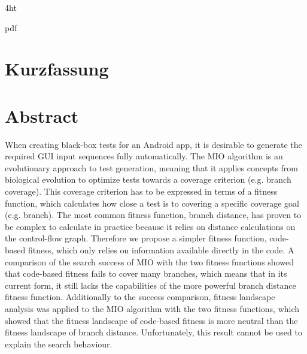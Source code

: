 \documentclass[
  a4paper,  %
  twoside,  %
  bibliography=totoc,
  headsepline,
  cleardoublepage=empty,
  parskip=half,
  draft=false
]{scrbook}
\begin{document}
	
\iftex4ht
  \Configure{$}{\PicMath}{\EndPicMath}{}

  {pdf}
  {%
  }
\fi



\Titelblatt

\pagestyle{preamble}
\renewcommand*{\chapterpagestyle}{preamble}


\ifdeutsch
  \section*{Kurzfassung}
\else
  \section*{Abstract}
\fi

When creating black-box tests for an Android app, it is desirable to generate the required GUI input sequences fully automatically.
The MIO algorithm is an evolutionary approach to test generation, meaning that it applies concepts from biological evolution to optimize tests towards a coverage criterion (e.g. branch coverage).
This coverage criterion has to be expressed in terms of a fitness function, which calculates how close a test is to covering a specific coverage goal (e.g. branch).
The most common fitness function, branch distance, has proven to be complex to calculate in practice because it relies on distance calculations on the control-flow graph.
Therefore we propose a simpler fitness function, code-based fitness, which only relies on information available directly in the code.
A comparison of the search success of MIO with the two fitness functions showed that code-based fitness fails to cover many branches, which means that in its current form, it still lacks the capabilities of the more powerful branch distance fitness function.
Additionally to the success comparison, fitness landscape analysis was applied to the MIO algorithm with the two fitness functions, which showed that the fitness landscape of code-based fitness is more neutral than the fitness landscape of branch distance.
Unfortunately, this result cannot be used to explain the search behaviour.
\end{document}

